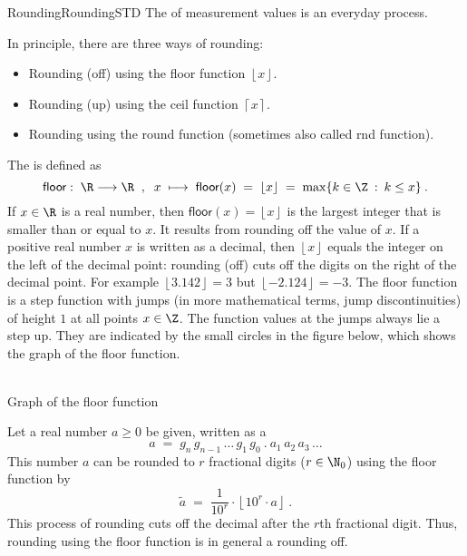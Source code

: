 \begin{MXContent}{Rounding}{Rounding}{STD}
The  of measurement values is an everyday process.

\begin{MInfo}

In principle, there are three ways of rounding:

\begin{itemize}
\item{Rounding (off) using the \textsf{floor} function $\left\lfloor{x}\right\rfloor$.}
\item{Rounding (up) using the \textsf{ceil} function $\left\lceil{ x}\right\rceil$.}
\item{Rounding using the \textsf{round} function (sometimes also called \textsf{rnd} function).}
\end{itemize}
\end{MInfo}

The  is defined as
$$
\textsf{floor}:\; \R\longrightarrow\R\;\; , \;\;
x\;\longmapsto\; \textsf{floor}(x)\;=\; \left\lfloor{ x}\right\rfloor\;=\; \max\lbrace k\in\Z\: :\: k\leq x\rbrace\: .
$$
If $x\in\R$ is a real number, then $\textsf{floor}(x)=\left\lfloor{ x}\right\rfloor$ is the largest integer 
that is smaller than or equal to $x$. It results from rounding off the value of $x$. If a positive 
real number $x$ is written as a decimal, then $\left\lfloor{ x}\right\rfloor$ equals the 
integer on the left of the decimal point: rounding (off) cuts off the digits on the right of the decimal point. 
For example $\left\lfloor{ 3.142}\right\rfloor=3$ but $\left\lfloor{ -2.124}\right\rfloor=-3$.
The \textsf{floor} function is a step function with jumps (in more mathematical terms, jump discontinuities) of height $1$ at all points 
$x\in \Z$. The function values at the jumps always lie a step up. They are indicated by the small circles in 
the figure below, which shows the graph of the \textsf{floor} function. 

\begin{center}
\\
Graph of the \textsf{floor} function
\end{center}

Let a real number $a\geq 0$ be given, written as a 
$$
a \;=\; g_n\, g_{n-1}\, \ldots\, g_1\, g_0\: .\: a_1\,a_2\, a_3\, \ldots
$$
This number $a$ can be rounded to $r$ fractional digits ($r\in\N_0$) using the \textsf{floor} function by
$$
\tilde a \;=\; \frac1{10^r}\cdot \left\lfloor{ 10^r\cdot a}\right\rfloor\: .
$$
This process of rounding cuts off the decimal after the $r$th fractional digit. Thus, rounding 
using the \textsf{floor} function is in general a rounding off.


\end{MXContent}
